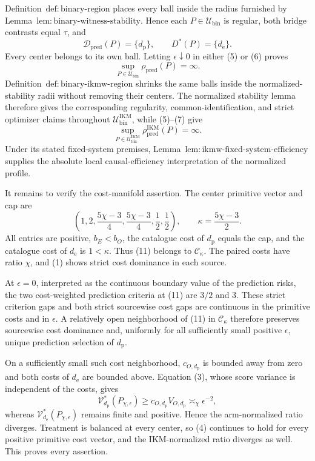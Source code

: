 Definition~\(\mathrm{def{:}binary\text{-}region}\) places every ball inside the radius furnished by Lemma~\(\mathrm{lem{:}binary\text{-}witness\text{-}stability}\). Hence each \(P\in\mathcal U_{\mathrm{bin}}\) is regular, both bridge contrasts equal \(\tau\), and
\[
 \mathcal D_{\mathrm{pred}}(P)=\{d_{\mathrm p}\},
 \qquad
 D^*(P)=\{d_{\mathrm e}\}.                            \tag{8}
\]
Every center belongs to its own ball. Letting \(\epsilon\downarrow0\) in either (5) or (6) proves
\[
 \sup_{P\in\mathcal U_{\mathrm{bin}}}\rho_{\mathrm{pred}}(P)=\infty. \tag{9}
\]
Definition~\(\mathrm{def{:}binary\text{-}ikmw\text{-}region}\) shrinks the same balls inside the normalized-stability radii without removing their centers. The normalized stability lemma therefore gives the corresponding regularity, common-identification, and strict optimizer claims throughout \(\mathcal U_{\mathrm{bin}}^{\mathrm{IKM}}\), while (5)--(7) give
\[
 \sup_{P\in\mathcal U_{\mathrm{bin}}^{\mathrm{IKM}}}
 \rho_{\mathrm{pred}}^{\mathrm{IKM}}(P)=\infty.       \tag{10}
\]
Under its stated fixed-system premises, Lemma~\(\mathrm{lem{:}ikmw\text{-}fixed\text{-}system\text{-}efficiency}\) supplies the absolute local causal-efficiency interpretation of the normalized profile.

It remains to verify the cost-manifold assertion. The center primitive vector and cap are
\[
 \left(1,2,\frac{5\chi-3}{4},\frac{5\chi-3}{4},
 \frac12,\frac12\right),
 \qquad \kappa=\frac{5\chi-3}{2}.                     \tag{11}
\]
All entries are positive, \(b_E<b_O\), the catalogue cost of \(d_{\mathrm p}\) equals the cap, and the catalogue cost of \(d_{\mathrm e}\) is \(1<\kappa\). Thus (11) belongs to \(\mathcal C_\kappa\). The paired costs have ratio \(\chi\), and (1) shows strict cost dominance in each source.

At \(\epsilon=0\), interpreted as the continuous boundary value of the prediction risks, the two cost-weighted prediction criteria at (11) are \(3/2\) and \(3\). These strict criterion gaps and both strict sourcewise cost gaps are continuous in the primitive costs and in \(\epsilon\). A relatively open neighborhood of (11) in \(\mathcal C_\kappa\) therefore preserves sourcewise cost dominance and, uniformly for all sufficiently small positive \(\epsilon\), unique prediction selection of \(d_{\mathrm p}\).

On a sufficiently small such cost neighborhood, \(c_{O,d_{\mathrm p}}\) is bounded away from zero and both costs of \(d_{\mathrm e}\) are bounded above. Equation (3), whose score variance is independent of the costs, gives
\[
 \mathcal V_{d_{\mathrm p}}^*(P_{\chi,\epsilon})
 \ge c_{O,d_{\mathrm p}}V_{O,d_{\mathrm p}}
 \asymp_\chi\epsilon^{-2},                            \tag{12}
\]
whereas \(\mathcal V_{d_{\mathrm e}}^*(P_{\chi,\epsilon})\) remains finite and positive. Hence the arm-normalized ratio diverges. Treatment is balanced at every center, so (4) continues to hold for every positive primitive cost vector, and the IKM-normalized ratio diverges as well. This proves every assertion.
